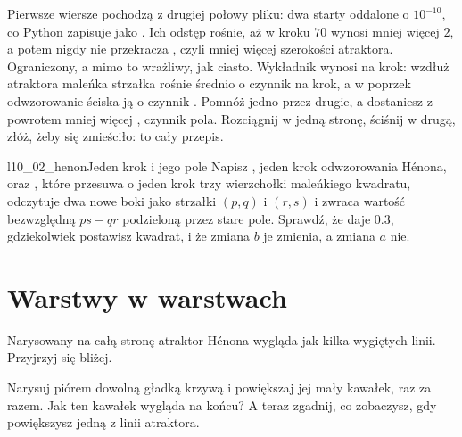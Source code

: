 

\noindent
Pierwsze wiersze pochodzą z drugiej połowy pliku: dwa starty oddalone o
$10^{-10}$, co Python zapisuje jako . Ich odstęp rośnie, aż w
kroku $70$ wynosi mniej więcej $2$, a potem nigdy nie przekracza
, czyli mniej więcej szerokości atraktora. Ograniczony, a
mimo to wrażliwy, jak ciasto. Wykładnik wynosi  na krok:
wzdłuż atraktora maleńka strzałka rośnie średnio o czynnik
 na krok, a w poprzek odwzorowanie ściska ją o czynnik
. Pomnóż jedno przez drugie, a dostaniesz z powrotem mniej
więcej , czynnik pola. Rozciągnij w jedną stronę, ściśnij w
drugą, złóż, żeby się zmieściło: to cały przepis.

\begin{lab}{l10_02_henon}{Jeden krok i jego pole}
Napisz , jeden krok odwzorowania Hénona, oraz ,
które przesuwa o jeden krok trzy wierzchołki maleńkiego kwadratu, odczytuje
dwa nowe boki jako strzałki $(p, q)$ i $(r, s)$ i zwraca wartość bezwzględną
$ps - qr$ podzieloną przez stare pole. Sprawdź, że daje \num{0.3},
gdziekolwiek postawisz kwadrat, i że zmiana $b$ je zmienia, a zmiana $a$ nie.
\end{lab}

\section{Warstwy w warstwach}
\label{sec:ch10-zoom}

\noindent
Narysowany na całą stronę atraktor Hénona wygląda jak kilka wygiętych linii.
Przyjrzyj się bliżej.

\begin{think}
Narysuj piórem dowolną gładką krzywą i powiększaj jej mały kawałek, raz za
razem. Jak ten kawałek wygląda na końcu? A teraz zgadnij, co zobaczysz, gdy
powiększysz jedną z linii atraktora.
\end{think}



